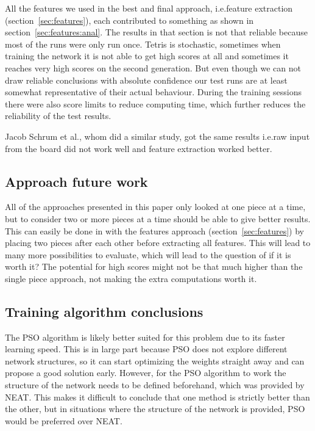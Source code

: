 \documentclass{article}
\begin{document}
All the features we used in the best and final approach, i.e.\@ feature extraction (section~\ref{sec:features}), each contributed to something as shown in section~\ref{sec:features:anal}.
The results in that section is not that reliable because most of the runs were only run once. Tetris is stochastic, sometimes when training the network it is not able to get high scores at all and sometimes it reaches very high scores on the second generation. But even though we can not draw reliable conclusions with absolute confidence our test runs are at least somewhat representative of their actual behaviour. During the training sessions there were also score limits to reduce computing time, which further reduces the reliability of the test results.

Jacob Schrum et al.\@\cite{comparingNEAT}, whom did a similar study, got the same results i.e.\@ raw input from the board did not work well and feature extraction worked better.

\subsection{Approach future work}
All of the approaches presented in this paper only looked at one piece at a time, but to consider two or more pieces at a time should be able to give better results.
This can easily be done in with the features approach (section~\ref{sec:features}) by placing two pieces after each other before extracting all features. This will lead to many more possibilities to evaluate, which will lead to the question of if it is worth it? The potential for high scores might not be that much higher than the single piece approach, not making the extra computations worth it.

\subsection{Training algorithm conclusions}

The PSO algorithm is likely better suited for this problem due to its faster learning speed. This is in large part because PSO does not explore different network structures, so it can start optimizing the weights straight away and can propose a good solution early. 
However, for the PSO algorithm to work the structure of the network needs to be defined beforehand, which was provided by NEAT. This makes it difficult to conclude that one method is strictly better than the other, but in situations where the structure of the network is provided, PSO would be preferred over NEAT.


 
\end{document}
